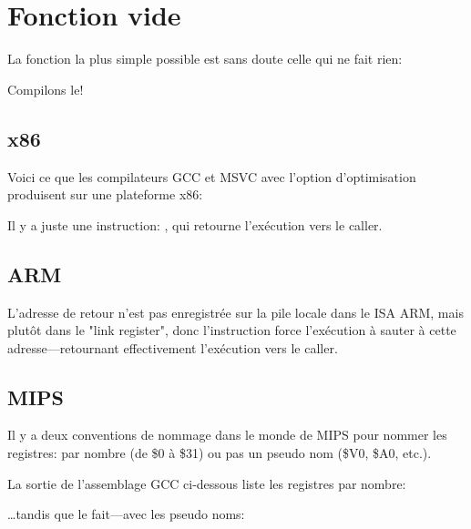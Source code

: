 \section{Fonction vide}
\label{empty_func}

La fonction la plus simple possible est sans doute celle qui ne fait rien:



Compilons le!

\subsection{x86}

Voici ce que les compilateurs GCC et MSVC avec l'option d'optimisation produisent sur une plateforme x86:



Il y a juste une instruction: \RET, qui retourne l'exécution vers le \gls{caller}. %

\subsection{ARM}



L'adresse de retour n'est pas enregistrée sur la pile locale dans le \ac{ISA} ARM, mais plutôt dans le "link register", %
donc l'instruction  force l'exécution à sauter à cette adresse---retournant effectivement l'exécution vers le \gls{caller}.

\subsection{MIPS}

Il y a deux conventions de nommage dans le monde de MIPS pour nommer les registres:
par nombre (de \$0 à \$31) ou pas un pseudo nom (\$V0, \$A0, etc.).

La sortie de l'assemblage GCC ci-dessous liste les registres par nombre:



\dots tandis que \IDA le fait---avec les pseudo noms:

